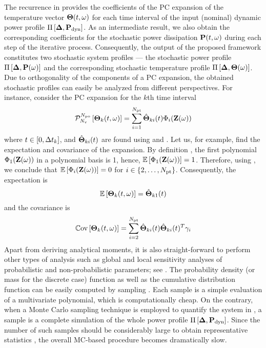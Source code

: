 The recurrence in  provides the coefficients of the PC expansion of the temperature vector ${\boldsymbol\Theta}(t, \omega)$ for each time interval of the input (nominal) dynamic power profile $\prof{\mP_\dyn}$. As an intermediate result, we also obtain the corresponding coefficients for the stochastic power dissipation $\mathbf{P}(t, \omega)$ during each step of the iterative process. Consequently, the output of the proposed framework constitutes two stochastic system profiles --- the stochastic power profile $\prof{\mP(\o)}$ and the corresponding stochastic temperature profile $\Pi\left[\boldsymbol{\Delta}, {\boldsymbol\Theta}(\omega)\right]$. Due to orthogonality of the components of a PC expansion, the obtained stochastic profiles can easily be analyzed from different perspectives. For instance, consider the PC expansion for the $k$th time interval
\begin{equation} \elabel{pc-k}
  \oPC{\vars}{\pcorder}{\vTO_k(\t, \o)} = \sum_{i = 1}^{\pcterms} \pcc{\vTO}_{ki}(\t) \pcb_i(\vZ(\o))
\end{equation}
where $t \in [0, \Delta t_k]$, and $\hat{{\boldsymbol\Theta}}_{ki}(t)$ are found using  and . Let us, for example, find the expectation and covariance of the expansion. By definition \cite{xiu2002}, the first polynomial $\Phi_1(\mathbf{Z}(\omega))$ in a polynomial basis is 1, hence, $\mathbb{E}\left[\Phi_1(\mathbf{Z}(\omega))\right] = 1$. Therefore, using , we conclude that $\mathbb{E}\left[\Phi_i(\mathbf{Z}(\omega))\right] = 0$ for $i \in \{ 2, \dotsc, {N_\text{pt}} \}$. Consequently, the expectation is
\[
  \mathbb{E}\left[{\boldsymbol\Theta}_k(t, \omega)\right] = \hat{{\boldsymbol\Theta}}_{k1}(t)
\]
and the covariance is
\[
  \mathbb{C}\text{ov}\left[{\boldsymbol\Theta}_k(t, \omega)\right] = \sum_{i = 2}^{{N_\text{pt}}} \hat{{\boldsymbol\Theta}}_{ki}(t) \hat{{\boldsymbol\Theta}}_{ki}(t)^T \gamma_i
\]
Apart from deriving analytical moments, it is also straight-forward to perform other types of analysis such as global and local sensitivity analyses of probabilistic and non-probabilistic parameters; see \cite{eldred2009, maitre2010}. The probability density (or mass for the discrete case) function as well as the cumulative distribution function can be easily computed by sampling . Each sample is a simple evaluation of a multivariate polynomial, which is computationally cheap. On the contrary, when a Monte Carlo sampling technique is employed to quantify the system in , a sample is a complete simulation of the whole power profile $\prof{\mP_\dyn}$. Since the number of such samples should be considerably large to obtain representative statistics \cite{xiu2009}, the overall MC-based procedure becomes dramatically slow.
